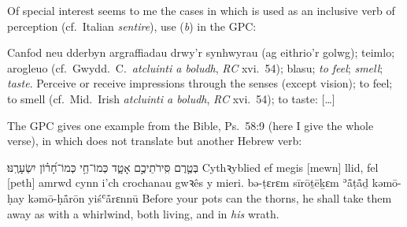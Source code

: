 \begin{enumerate}[A.]
		Of special interest seems to me the cases in which  is used as an inclusive verb of perception (cf.\ Italian \textit{sentire}), use (\textit{b}) in the GPC:
		\begin{changemargin}{1cm}{0cm}
			\begin{bilingquote}
				\transline
				{{Canfod neu dderbyn argraffiadau drwy’r synhwyrau (ag eithrio’r golwg); teimlo; arogleuo (cf.\ Gwydd.~C.\ \textit{atcluinti a boludh}, \textit{RC} xvi.~54); blasu; \textit{to feel}; \textit{smell}; \textit{taste}.}}
				{Perceive or receive impressions through the senses (except vision); to feel; to smell (cf.\ Mid.~Irish \textit{atcluinti a boludh}, \textit{RC} xvi.~54); to taste: […]}
			\end{bilingquote}
		\end{changemargin}
		\vspace{-0.5cm}
		The GPC gives one example from the Bible, Ps.~58:9 (here I give the whole verse), in which  does not translate {\shama} but another Hebrew verb:
		\begin{changemargin}{1cm}{0cm}
			\begin{bilingquote}
				\quoling
				{בְּטֶ֤רֶם  סִּֽירֹתֵיכֶ֣ם אָטָ֑ד כְּמוֹ־חַ֥י כְּמוֹ־חָ֝ר֗וֹן יִשְׂעָרֶֽנּוּ׃}
				{Cythꝛyblied ef megis [mewn] llid, fel [peth] amrwd cynn i’ch crochanau  gwꝛês y mieri.}
				{bə-ṭɛrɛm  sīrōṯēḵɛm ʾå̄ṭå̄ḏ kəmō-ḥay kəmō-ḥå̄rōn yiśʿå̄rɛnnū}
				{Before your pots can  the thorns, he shall take them away as with a whirlwind, both living, and in \textit{his} wrath.}
			\end{bilingquote}
		\end{changemargin}
		\vspace{-0.5cm}
\end{enumerate}
